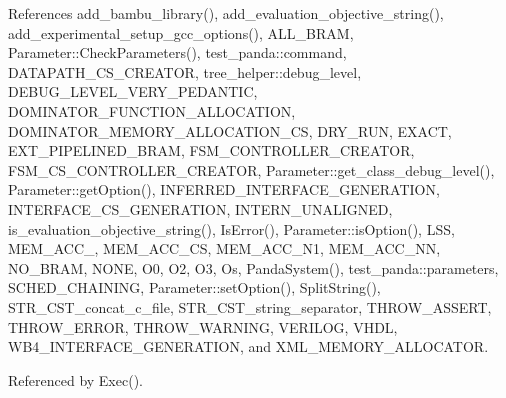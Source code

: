 References add\+\_\+bambu\+\_\+library(), add\+\_\+evaluation\+\_\+objective\+\_\+string(), add\+\_\+experimental\+\_\+setup\+\_\+gcc\+\_\+options(), A\+L\+L\+\_\+\+B\+R\+AM, Parameter\+::\+Check\+Parameters(), test\+\_\+panda\+::command, D\+A\+T\+A\+P\+A\+T\+H\+\_\+\+C\+S\+\_\+\+C\+R\+E\+A\+T\+OR, tree\+\_\+helper\+::debug\+\_\+level, D\+E\+B\+U\+G\+\_\+\+L\+E\+V\+E\+L\+\_\+\+V\+E\+R\+Y\+\_\+\+P\+E\+D\+A\+N\+T\+IC, D\+O\+M\+I\+N\+A\+T\+O\+R\+\_\+\+F\+U\+N\+C\+T\+I\+O\+N\+\_\+\+A\+L\+L\+O\+C\+A\+T\+I\+ON, D\+O\+M\+I\+N\+A\+T\+O\+R\+\_\+\+M\+E\+M\+O\+R\+Y\+\_\+\+A\+L\+L\+O\+C\+A\+T\+I\+O\+N\+\_\+\+CS, D\+R\+Y\+\_\+\+R\+UN, E\+X\+A\+CT, E\+X\+T\+\_\+\+P\+I\+P\+E\+L\+I\+N\+E\+D\+\_\+\+B\+R\+AM, F\+S\+M\+\_\+\+C\+O\+N\+T\+R\+O\+L\+L\+E\+R\+\_\+\+C\+R\+E\+A\+T\+OR, F\+S\+M\+\_\+\+C\+S\+\_\+\+C\+O\+N\+T\+R\+O\+L\+L\+E\+R\+\_\+\+C\+R\+E\+A\+T\+OR, Parameter\+::get\+\_\+class\+\_\+debug\+\_\+level(), Parameter\+::get\+Option(), I\+N\+F\+E\+R\+R\+E\+D\+\_\+\+I\+N\+T\+E\+R\+F\+A\+C\+E\+\_\+\+G\+E\+N\+E\+R\+A\+T\+I\+ON, I\+N\+T\+E\+R\+F\+A\+C\+E\+\_\+\+C\+S\+\_\+\+G\+E\+N\+E\+R\+A\+T\+I\+ON, I\+N\+T\+E\+R\+N\+\_\+\+U\+N\+A\+L\+I\+G\+N\+ED, is\+\_\+evaluation\+\_\+objective\+\_\+string(), Is\+Error(), Parameter\+::is\+Option(), L\+SS, M\+E\+M\+\_\+\+A\+C\+C\+\_, M\+E\+M\+\_\+\+A\+C\+C\+\_\+\+CS, M\+E\+M\+\_\+\+A\+C\+C\+\_\+\+N1, M\+E\+M\+\_\+\+A\+C\+C\+\_\+\+NN, N\+O\+\_\+\+B\+R\+AM, N\+O\+NE, O0, O2, O3, Os, Panda\+System(), test\+\_\+panda\+::parameters, S\+C\+H\+E\+D\+\_\+\+C\+H\+A\+I\+N\+I\+NG, Parameter\+::set\+Option(), Split\+String(), S\+T\+R\+\_\+\+C\+S\+T\+\_\+concat\+\_\+c\+\_\+file, S\+T\+R\+\_\+\+C\+S\+T\+\_\+string\+\_\+separator, T\+H\+R\+O\+W\+\_\+\+A\+S\+S\+E\+RT, T\+H\+R\+O\+W\+\_\+\+E\+R\+R\+OR, T\+H\+R\+O\+W\+\_\+\+W\+A\+R\+N\+I\+NG, V\+E\+R\+I\+L\+OG, V\+H\+DL, W\+B4\+\_\+\+I\+N\+T\+E\+R\+F\+A\+C\+E\+\_\+\+G\+E\+N\+E\+R\+A\+T\+I\+ON, and X\+M\+L\+\_\+\+M\+E\+M\+O\+R\+Y\+\_\+\+A\+L\+L\+O\+C\+A\+T\+OR.



Referenced by Exec().

